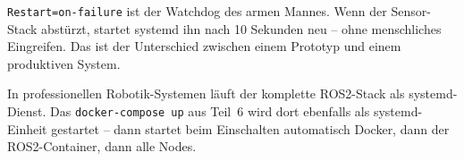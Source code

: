 \begin{merksatzBox}
\texttt{Restart=on-failure} ist der Watchdog des armen Mannes.
Wenn der Sensor-Stack abstürzt, startet systemd ihn nach
10 Sekunden neu -- ohne menschliches Eingreifen.
Das ist der Unterschied zwischen einem Prototyp und
einem produktiven System.
\end{merksatzBox}

\begin{robotikBox}
In professionellen Robotik-Systemen läuft der komplette ROS2-Stack
als systemd-Dienst. Das \texttt{docker-compose up} aus Teil~6
wird dort ebenfalls als systemd-Einheit gestartet -- dann
startet beim Einschalten automatisch Docker, dann der
ROS2-Container, dann alle Nodes.
\end{robotikBox}
